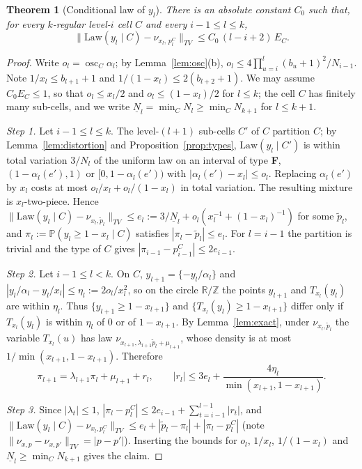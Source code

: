 \documentclass[11pt]{amsart}
\newtheorem{theorem}{Theorem}[section]
\theoremstyle{definition}
\numberwithin{equation}{section}
\newcommand{\R}{\mathbb{R}}
\newcommand{\Z}{\mathbb{Z}}
\newcommand{\Prob}{\mathbb{P}}
\newcommand{\fr}[1]{\{#1\}}
\DeclareMathOperator{\osc}{osc}
\begin{document}
\begin{theorem}[Conditional law of $y_l$]\label{thm:condlaw}
There is an absolute constant $C_0$ such that, for every $k$-regular level-$i$ cell $C$ and every $i-1\le l\le k$,
\[
\big\|\mathrm{Law}(y_l\mid C)-\nu_{x_l,\,p^C_l}\big\|_{TV}\le C_0\,(l-i+2)\,E_C .
\]
\end{theorem}

\begin{proof}
Write $o_l=\osc_C\alpha_l$; by Lemma~\ref{lem:osc}(b), $o_l\le4\prod_{u=i}^{l}(b_u+1)^2/N_{i-1}$. Note $1/x_l\le b_{l+1}+1$ and
$1/(1-x_l)\le2(b_{l+2}+1)$. We may assume $C_0E_C\le1$, so that $o_l\le x_l/2$ and $o_l\le(1-x_l)/2$ for $l\le k$; the cell
$C$ has finitely many sub-cells, and we write $\underline N_l=\min_CN_l\ge\min_CN_{k+1}$ for $l\le k+1$.

\emph{Step 1.} Let $i-1\le l\le k$. The level-$(l+1)$ sub-cells $C'$ of $C$ partition $C$; by Lemma~\ref{lem:distortion} and
Proposition~\ref{prop:types}, $\mathrm{Law}(y_l\mid C')$ is within total variation $3/N_l$ of the uniform law on an interval of type
\textbf F, $(1-\alpha_l(e'),1)$ or $[0,1-\alpha_l(e'))$ with $|\alpha_l(e')-x_l|\le o_l$. Replacing $\alpha_l(e')$ by $x_l$ costs at most
$o_l/x_l+o_l/(1-x_l)$ in total variation. The resulting mixture is $x_l$-two-piece. Hence
$\|\mathrm{Law}(y_l\mid C)-\nu_{x_l,\tilde p_l}\|_{TV}\le e_l:=3/\underline N_l+o_l(x_l^{-1}+(1-x_l)^{-1})$ for some $\tilde p_l$, and
$\pi_l:=\Prob(y_l\ge1-x_l\mid C)$ satisfies $|\pi_l-\tilde p_l|\le e_l$. For $l=i-1$ the partition is trivial and the type of $C$ gives
$|\pi_{i-1}-p^C_{i-1}|\le 2e_{i-1}$.

\emph{Step 2.} Let $i-1\le l<k$. On $C$, $y_{l+1}=\fr{-y_l/\alpha_l}$ and $|y_l/\alpha_l-y_l/x_l|\le\eta_l:=2o_l/x_l^2$, so on the circle
$\R/\Z$ the points $y_{l+1}$ and $T_{x_l}(y_l)$ are within $\eta_l$. Thus $\{y_{l+1}\ge1-x_{l+1}\}$ and
$\{T_{x_l}(y_l)\ge1-x_{l+1}\}$ differ only if $T_{x_l}(y_l)$ is within $\eta_l$ of $0$ or of $1-x_{l+1}$. By Lemma~\ref{lem:exact}, under
$\nu_{x_l,\tilde p_l}$ the variable $T_{x_l}(u)$ has law $\nu_{x_{l+1},\lambda_{l+1}\tilde p_l+\mu_{l+1}}$, whose density is at most
$1/\min(x_{l+1},1-x_{l+1})$. Therefore
\[
\pi_{l+1}=\lambda_{l+1}\pi_l+\mu_{l+1}+r_l,\qquad |r_l|\le3e_l+\frac{4\eta_l}{\min(x_{l+1},1-x_{l+1})}.
\]

\emph{Step 3.} Since $|\lambda_t|\le1$, $|\pi_l-p^C_l|\le2e_{i-1}+\sum_{t=i-1}^{l-1}|r_t|$, and
$\|\mathrm{Law}(y_l\mid C)-\nu_{x_l,p^C_l}\|_{TV}\le e_l+|\tilde p_l-\pi_l|+|\pi_l-p^C_l|$ (note
$\|\nu_{x,p}-\nu_{x,p'}\|_{TV}=|p-p'|$). Inserting the bounds for $o_l$, $1/x_l$, $1/(1-x_l)$ and $\underline N_l\ge\min_CN_{k+1}$ gives the claim.
\end{proof}
\end{document}
